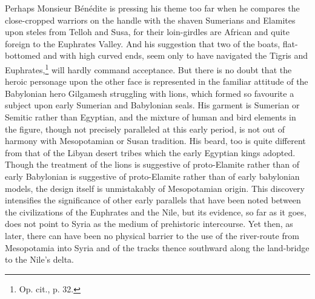 \documentclass[12pt,oneside]{book}
\begin{document}
Perhaps Monsieur B\'en\'edite is pressing his theme too far when he compares the close-cropped warriors on the handle with the shaven Sumerians and Elamites upon steles from Telloh and Susa, for their loin-girdles are African and quite foreign to the Euphrates Valley. And his suggestion that two of the boats, flat-bottomed and with high curved ends, seem only to have navigated the Tigris and Euphrates,\footnote{Op. cit., p. 32.} will hardly command acceptance. But there is no doubt that the heroic personage upon the other face is represented in the familiar attitude of the Babylonian hero Gilgamesh struggling with lions, which formed so favourite a subject upon early Sumerian and Babylonian seals. His garment is Sumerian or Semitic rather than Egyptian, and the mixture of human and bird elements in the figure, though not precisely paralleled at this early period, is not out of harmony with Mesopotamian or Susan tradition. His beard, too is quite different from that of the Libyan desert tribes which the early Egyptian kings adopted. Though the treatment of the lions is suggestive of proto-Elamite rather than of early Babylonian is suggestive of proto-Elamite rather than of early babylonian models, the design itself is unmistakably of Mesopotamian origin. This discovery intensifies the significance of other early parallels that have been noted between the civilizations of the Euphrates and the Nile, but its evidence, so far as it goes, does not point to Syria as the medium of prehistoric intercourse. Yet then, as later, there can have been no physical barrier to the use of the river-route from Mesopotamia into Syria and of the tracks thence southward along the land-bridge to the Nile's delta. \par 
\end{document}

